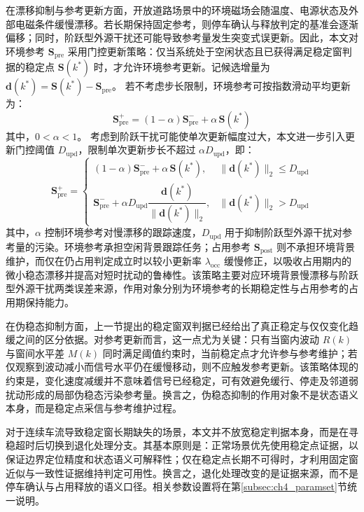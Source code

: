 \documentclass{xdupgthesis}
\begin{document}
在漂移抑制与参考更新方面，开放道路场景中的环境磁场会随温度、电源状态及外部电磁条件缓慢漂移。若长期保持固定参考，则停车确认与释放判定的基准会逐渐偏移；同时，阶跃型外源干扰还可能导致参考量发生突变式误更新\cite{ch4_zhang2020railway}。因此，本文对环境参考 $\mathbf{S}_{\mathrm{pre}}$ 采用门控更新策略：仅当系统处于空闲状态且已获得满足稳定窗判据的稳定点 $\mathbf{S}(k^\ast)$ 时，才允许环境参考更新。记候选增量为 $\mathbf{d}(k^\ast)=\mathbf{S}(k^\ast)-\mathbf{S}_{\mathrm{pre}}$。
若不考虑步长限制，环境参考可按指数滑动平均更新为：
\begin{equation}
    \mathbf{S}_{\mathrm{pre}}^{+}=(1-\alpha)\mathbf{S}_{\mathrm{pre}}^{-}+\alpha\,\mathbf{S}(k^\ast)
\end{equation}
其中，$0<\alpha<1$。
考虑到阶跃干扰可能使单次更新幅度过大，本文进一步引入更新门控阈值 $D_{\mathrm{upd}}$，限制单次更新步长不超过 $\alpha D_{\mathrm{upd}}$，即：
\begin{equation}
    \mathbf{S}_{\mathrm{pre}}^{+}=
    \begin{cases}
        (1-\alpha)\mathbf{S}_{\mathrm{pre}}^{-}+\alpha\,\mathbf{S}(k^\ast), & \lVert\mathbf{d}(k^\ast)\rVert_2\le D_{\mathrm{upd}}\\
        \mathbf{S}_{\mathrm{pre}}^{-}+\alpha D_{\mathrm{upd}}\dfrac{\mathbf{d}(k^\ast)}{\lVert\mathbf{d}(k^\ast)\rVert_2}, & \lVert\mathbf{d}(k^\ast)\rVert_2>D_{\mathrm{upd}}
    \end{cases}
\end{equation}
其中，$\alpha$ 控制环境参考对慢漂移的跟踪速度，$D_{\mathrm{upd}}$ 用于抑制阶跃型外源干扰对参考量的污染。环境参考承担空闲背景跟踪任务；占用参考 $\mathbf{S}_{\mathrm{post}}$ 则不承担环境背景维护，而仅在仍占用判定成立时以较小更新率 $\lambda_{\mathrm{occ}}$ 缓慢修正，以吸收占用期内的微小稳态漂移并提高对短时扰动的鲁棒性。该策略主要对应环境背景慢漂移与阶跃型外源干扰两类误差来源，作用对象分别为环境参考的长期稳定性与占用参考的占用期保持能力。

在伪稳态抑制方面，上一节提出的稳定窗双判据已经给出了真正稳定与仅仅变化趋缓之间的区分依据。对参考更新而言，这一点尤为关键：只有当窗内波动 $R(k)$ 与窗间水平差 $M(k)$ 同时满足阈值约束时，当前稳定点才允许参与参考维护；若仅观察到波动减小而信号水平仍在缓慢移动，则不应触发参考更新。该策略体现的约束是，变化速度减缓并不意味着信号已经稳定，可有效避免缓行、停走及邻道弱扰动形成的局部伪稳态污染参考量。换言之，伪稳态抑制的作用对象不是状态语义本身，而是稳定点采信与参考维护过程。

对于连续车流导致稳定窗长期缺失的场景，本文并不放宽稳定判据本身，而是在寻稳超时后切换到退化处理分支。其基本原则是：正常场景优先使用稳定点证据，以保证边界定位精度和状态语义可解释性；仅在稳定点长期不可得时，才利用固定窗近似与一致性证据维持判定可用性。换言之，退化处理改变的是证据来源，而不是停车确认与占用释放的语义口径。相关参数设置将在第\ref{subsec:ch4_paramset}节统一说明。
\end{document}
